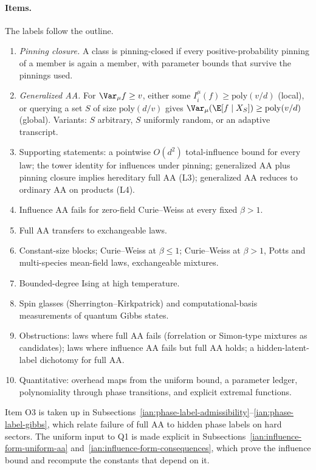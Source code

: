 \paragraph{Items.} The labels follow the outline.
\begin{enumerate}
\item[F4] \emph{Pinning closure.} A class is pinning-closed if every positive-probability pinning of a member is again a member, with parameter bounds that survive the pinnings used.
\item[F5] \emph{Generalized AA.} For \(\Var_\mu f\ge v\), either some \(I_i^\mu(f)\ge\mathrm{poly}(v/d)\) (local), or querying a set \(S\) of size \(\mathrm{poly}(d/v)\) gives \(\Var_\mu(\E[f\mid X_S])\ge\mathrm{poly}(v/d)\) (global). Variants: \(S\) arbitrary, \(S\) uniformly random, or an adaptive transcript.
\item[L1--L4] Supporting statements: a pointwise \(O(d^2)\) total-influence bound for every law; the tower identity for influences under pinning; generalized AA plus pinning closure implies hereditary full AA (L3); generalized AA reduces to ordinary AA on products (L4).
\item[L5] Influence AA fails for zero-field Curie--Weiss at every fixed \(\beta>1\).
\item[L6] Full AA transfers to exchangeable laws.
\item[P0b, P0\('\), P1] Constant-size blocks; Curie--Weiss at \(\beta\le1\); Curie--Weiss at \(\beta>1\), Potts and multi-species mean-field laws, exchangeable mixtures.
\item[P2] Bounded-degree Ising at high temperature.
\item[P3] Spin glasses (Sherrington--Kirkpatrick) and computational-basis measurements of quantum Gibbs states.
\item[O1--O3] Obstructions: laws where full AA fails (forrelation or Simon-type mixtures as candidates); laws where influence AA fails but full AA holds; a hidden-latent-label dichotomy for full AA.
\item[Q1--Q4] Quantitative: overhead maps from the uniform bound, a parameter ledger, polynomiality through phase transitions, and explicit extremal functions.
\end{enumerate}
Item O3 is taken up in Subsections~\ref{ian:phase-label-admissibility}--\ref{ian:phase-label-gibbs}, which relate failure of full AA to hidden phase labels on hard sectors. The uniform input to Q1 is made explicit in Subsections~\ref{ian:influence-form-uniform-aa} and~\ref{ian:influence-form-consequences}, which prove the influence bound and recompute the constants that depend on it.
